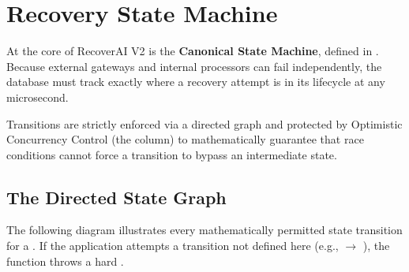 
\section{Recovery State Machine}

\begin{tcolorbox}[summarybox={\iconFlow[1.5] Tracking Financial Reality}]
\color{textdark}
At the core of RecoverAI V2 is the \textbf{Canonical State Machine}, defined in . Because external gateways and internal processors can fail independently, the database must track exactly where a recovery attempt is in its lifecycle at any microsecond.

Transitions are strictly enforced via a directed graph and protected by Optimistic Concurrency Control (the  column) to mathematically guarantee that race conditions cannot force a transition to bypass an intermediate state.
\end{tcolorbox}

\vspace{0.8cm}

\subsection{The Directed State Graph}

The following diagram illustrates every mathematically permitted state transition for a . If the application attempts a transition not defined here (e.g.,  $\rightarrow$ ), the  function throws a hard .

\vspace{0.5cm}

